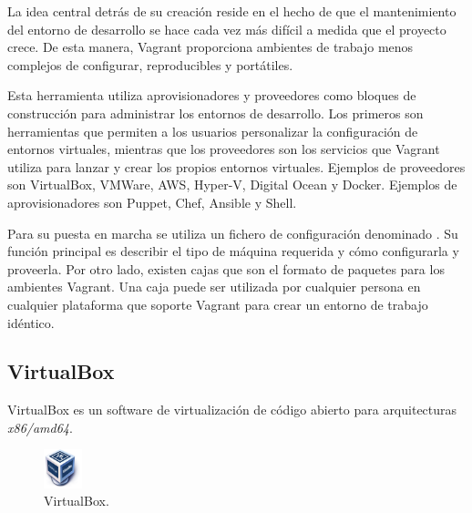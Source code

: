 La idea central detrás de su creación reside en el hecho de que el mantenimiento del entorno de desarrollo se hace cada vez más difícil a medida que el proyecto crece. De esta manera, Vagrant proporciona ambientes de trabajo menos complejos de configurar, reproducibles y portátiles.

Esta herramienta utiliza aprovisionadores y proveedores como bloques de construcción para administrar los entornos de desarrollo. Los primeros son herramientas que permiten a los usuarios personalizar la configuración de entornos virtuales, mientras que los proveedores son los servicios que Vagrant utiliza para lanzar y crear los propios entornos virtuales. Ejemplos de proveedores son VirtualBox, VMWare, AWS, Hyper-V, Digital Ocean y Docker. Ejemplos de aprovisionadores son Puppet, Chef, Ansible y Shell.

Para su puesta en marcha se utiliza un fichero de configuración denominado . Su función principal es describir el tipo de máquina requerida y cómo configurarla y proveerla. Por otro lado, existen cajas que son el formato de paquetes para los ambientes Vagrant. Una caja puede ser utilizada por cualquier persona en cualquier plataforma que soporte Vagrant para crear un entorno de trabajo idéntico.

\subsection{VirtualBox}

VirtualBox es un software de virtualización de código abierto para arquitecturas \textit{x86/amd64}. 

\begin{figure}[H]
\centering
\includegraphics[width=0.1\textwidth]{images/figures/virtualbox.png}
\caption{VirtualBox.\footnotemark}
\end{figure}


